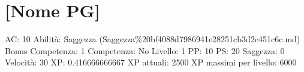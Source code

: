 \section{{[}Nome PG{]}}\label{nome-pg}

AC: 10 Abilità: Saggezza
(Saggezza\%20bf4088d7986941e28251cb3d2c451c6c.md) Bonus Competenza: 1
Competenza: No Livello: 1 PP: 10 PS: 20 Saggezza: 0 Velocità: 30 XP:
0.416666666667 XP attuali: 2500 XP massimi per livello: 6000
